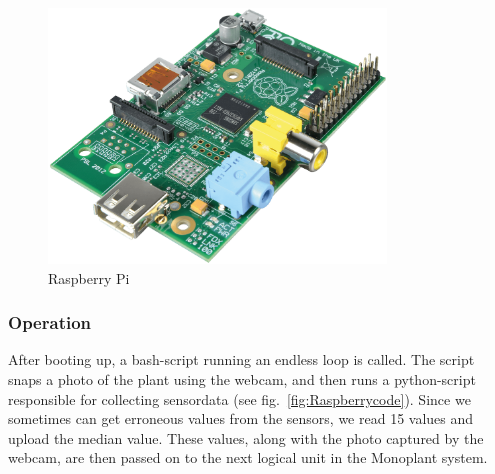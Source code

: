 \begin{figure}
\centering
\includegraphics[width=0.8\textwidth]{img/hardware/raspberry.png}
\caption{Raspberry Pi}
\label{fig:Raspberry}
\end{figure}


\subsubsection{Operation}
After booting up, a bash-script running an endless loop is called. The script snaps a photo of the plant using the webcam, and then runs a python-script responsible for collecting sensordata (see fig.~\ref{fig:Raspberrycode}). Since we sometimes can get erroneous values from the sensors, we read 15 values and upload the median value. These values, along with the photo captured by the webcam, are then passed on to the next logical unit in the Monoplant system. 

